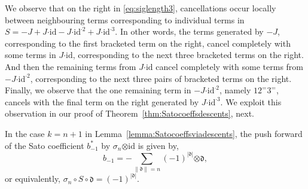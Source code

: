 \documentclass[10pt,a4paper]{amsart}
\newcommand*{\botimes}{\boldsymbol{\otimes}}
\newcommand*{\cendot}{\boldsymbol{\cdot}}
\newcommand*{\df}{\mathfrak d}
\newcommand*{\id}{{\mathrm{id}}}
\begin{document}
\begin{remark}\label{rmk:mainthmstrategy}
 We observe that on the right in \eqref{eq:siglength3}, cancellations occur locally between neighbouring terms corresponding to individual terms in $S=-J+J\cendot\id-J\cendot\id^{\cendot2}+J\cendot\id^{\cendot3}$.
 In other words, the terms generated by $-J$, corresponding to the first bracketed term on the right, cancel completely with some terms in $J\cendot\id$, corresponding to the next three bracketed terms on the right.
 And then the remaining terms from $J\cendot\id$ cancel completely with some terms from $-J\cendot\id^{\cendot2}$, corresponding to the next three pairs of bracketed terms on the right.
 Finally, we observe that the  one remaining term in $-J\cendot\id^{\cendot2}$, namely $12^=3^=$, cancels with the final term on the right generated by $J\cendot\id^{\cendot3}$. 
 We exploit this observation in our proof of Theorem~\ref{thm:Satocoeffsdescents}, next.  
\end{remark}

\begin{theorem}\label{thm:Satocoeffsdescents}
  In the case $k=n+1$ in Lemma~\ref{lemma:Satocoeffsviadescents}, the push forward of the Sato coefficient $b^\ast_{-1}$ by $\sigma_n\botimes\id$ is given by,
  \begin{equation}\label{eq:finalSatocoeff}
        b_{-1}=-\sum_{\|\df\|=n}(-1)^{|\df|}\botimes\df,
  \end{equation}
  or equivalently, $\sigma_n\circ S\circ\df=(-1)^{|\df|}$.
\end{theorem}
\end{document}
